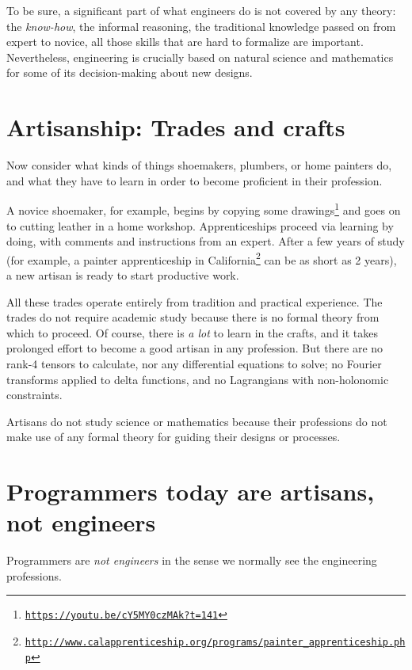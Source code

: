 To be sure, a significant part of what engineers do is not covered
by any theory: the \emph{know-how}, the informal reasoning, the traditional
knowledge passed on from expert to novice,  \textemdash{} all those
skills that are hard to formalize are important. Nevertheless, engineering
is crucially based on natural science and mathematics for some of
its decision-making about new designs.

\section{Artisanship: Trades and crafts }

Now consider what kinds of things shoemakers, plumbers, or home painters
do, and what they have to learn in order to become proficient in their
profession.

A novice shoemaker, for example, begins by copying some drawings\footnote{\texttt{\href{https://youtu.be/cY5MY0czMAk?t=141}{https://youtu.be/cY5MY0czMAk?t=141}}}
and goes on to cutting leather in a home workshop. Apprenticeships
proceed via learning by doing, with comments and instructions from
an expert. After a few years of study (for example, a painter apprenticeship
in California\footnote{\texttt{\href{http://www.calapprenticeship.org/programs/painter_apprenticeship.php}{http://www.calapprenticeship.org/programs/painter\_apprenticeship.php}}}
can be as short as 2 years), a new artisan is ready to start productive
work. 

All these trades operate entirely from tradition and practical experience.
The trades do not require academic study because there is no formal
theory from which to proceed. Of course, there is \emph{a lot} to
learn in the crafts, and it takes prolonged effort to become a good
artisan in any profession. But there are no rank-4 tensors to calculate,
nor any differential equations to solve; no Fourier transforms applied
to delta functions, and no Lagrangians with non-holonomic constraints.

Artisans do not study science or mathematics because their professions
do not make use of any formal theory for guiding their designs or
processes.

\section{Programmers today are artisans, not engineers }

Programmers are \emph{not engineers} in the sense we normally see
the engineering professions.

